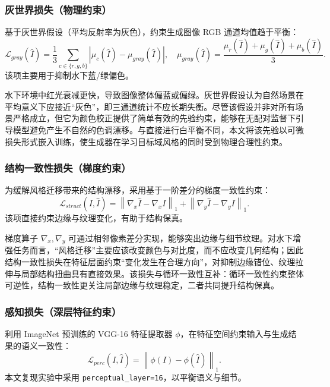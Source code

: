 \documentclass[a4paper,zihao=-4,linespread=1.25]{ctexart}
\begin{document}
\subsubsection{灰世界损失（物理约束）}
基于灰世界假设（平均反射率为灰色），约束生成图像 RGB 通道均值趋于平衡：
\begin{equation}
\mathcal{L}_{gray}(\hat{I})=\frac{1}{3}\sum_{c\in\{r,g,b\}}\left|\mu_c(\hat{I})-\mu_{gray}(\hat{I})\right|,\quad
\mu_{gray}(\hat{I})=\frac{\mu_r(\hat{I})+\mu_g(\hat{I})+\mu_b(\hat{I})}{3}.
\end{equation}
该项主要用于抑制水下蓝/绿偏色。

水下环境中红光衰减更快，导致图像整体偏蓝或偏绿。灰世界假设认为自然场景在平均意义下应接近“灰色”，即三通道统计不应长期失衡。尽管该假设并非对所有场景严格成立，但它为颜色校正提供了简单有效的先验约束，能够在无配对监督下引导模型避免产生不自然的色调漂移。与直接进行白平衡不同，本文将该先验以可微损失形式嵌入训练，使生成器在学习目标域风格的同时受到物理合理性约束。

\subsubsection{结构一致性损失（梯度约束）}
为缓解风格迁移带来的结构漂移，采用基于一阶差分的梯度一致性约束：
\begin{equation}
\mathcal{L}_{struct}(I,\hat{I})=\left\|\nabla_x \hat{I}-\nabla_x I\right\|_1+\left\|\nabla_y \hat{I}-\nabla_y I\right\|_1.
\end{equation}
该项直接约束边缘与纹理变化，有助于结构保真。

梯度算子 $\nabla_x,\nabla_y$ 可通过相邻像素差分实现，能够突出边缘与细节纹理。对水下增强任务而言，“风格迁移”主要应该改变颜色与对比度，而不应改变几何结构；因此结构一致性损失在特征层面约束“变化发生在合理方向”，对抑制边缘错位、纹理拉伸与局部结构扭曲具有直接效果。该损失与循环一致性互补：循环一致性约束整体可逆性，结构一致性更关注局部边缘与纹理稳定，二者共同提升结构保真。

\subsubsection{感知损失（深层特征约束）}
利用 ImageNet 预训练的 VGG-16 特征提取器 $\phi$，在特征空间约束输入与生成结果的语义一致性：
\begin{equation}
\mathcal{L}_{perc}(I,\hat{I})=\left\|\phi(I)-\phi(\hat{I})\right\|_1.
\end{equation}
本文复现实验中采用 \texttt{perceptual\_layer=16}，以平衡语义与细节。
\end{document}

